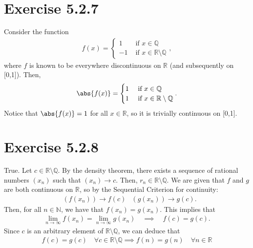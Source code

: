 \documentclass[11pt]{article}
\newcommand{\N}{\mathbb{N}}  %
\newcommand{\R}{\mathbb{R}}  %
\newcommand{\Q}{\mathbb{Q}}  %
\begin{document}
\section*{Exercise 5.2.7}\vspace{-1em}
    Consider the function
    \begin{align}
        f(x)=\begin{cases}
            1 & \text{ if } x\in\Q \\
            -1 & \text{ if } x\in\R\setminus\Q
        \end{cases},
    \end{align}
    where $f$ is known to be everywhere discontinuous on $\R$ (and subsequently on [0,1]). Then,
    \begin{align}
        \abs{f(x)}=\begin{cases}
            1 & \text{ if } x\in\Q \\
            1 & \text{ if } x\in\R\setminus\Q
        \end{cases}.
    \end{align}
    Notice that $\abs{f(x)}=1$ for all $x\in\R$, so it is trivially continuous on [0,1].
    \vspace{-1em}

\section*{Exercise 5.2.8}\vspace{-1em}
    True. Let $c\in\R\setminus\Q$. By the density theorem, there exists a sequence of rational numbers $(x_n)$ such that $(x_n)\to c$. Then, $r_n\in\R\setminus\Q$. We are given that $f$ and $g$ are both continuous on $\R$, so by the Sequential Criterion for continuity:
    \begin{align} &(f(x_n))\to f(c) &(g(x_n))\to g(c).\end{align}
    Then, for all $n\in\N$, we have that $f(x_n)=g(x_n)$. This implies that
    \begin{align} \lim_{n\to\infty}f(x_n) = \lim_{n\to\infty}g(x_n) \quad\implies\quad f(c)=g(c). \end{align}
    Since $c$ is an arbitrary element of $\R\setminus\Q$, we can deduce that
    \begin{align} f(c)=g(c) \quad \forall c\in\R\setminus\Q\implies f(n)=g(n) \quad \forall n\in\R \end{align}
    \vspace{-1em}
\end{document}
